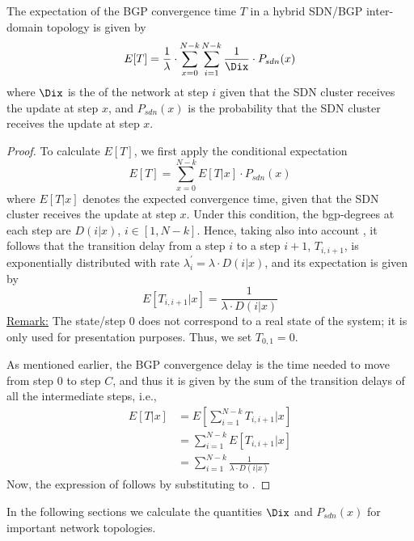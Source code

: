 \begin{theorem}\label{thm:expected-delay-generic}
The expectation of the BGP convergence time $T$ in a hybrid SDN/BGP inter-domain topology is given by
\begin{equation}\label{eq:theorem-expected-delay-generic}
E[T] = \frac{1}{\lambda}\cdot \sum_{x=0}^{N-k}\sum_{i=1}^{N-k}\frac{1}{\Dix}\cdot P_{sdn}(x)
\end{equation}
where $\Dix$ is the \bgp of the network at step $i$ given that the SDN cluster receives the update at step $x$, and $P_{sdn}(x)$ is the probability that the SDN cluster receives the update at step $x$.
\end{theorem}
\begin{proof}
To calculate $E[T]$, we first apply the conditional expectation
\begin{equation}\label{eq:ET-sum-ETx}
E[T] = \sum_{x=0}^{N-k}E[T|x]\cdot P_{sdn}(x)
\end{equation}
where $E[T|x]$ denotes the expected convergence time, given that the SDN cluster receives the update at step $x$. Under this condition, the bgp-degrees at each step are $D(i|x)$, $i\in[1,N-k]$. Hence, taking also into account , it follows that the transition delay from a step $i$ to a step $i+1$, $T_{i,i+1}$, is exponentially distributed with rate $\lambda_{i}^{'} = \lambda\cdot D(i|x)$, and its expectation is given by
\begin{equation}
E[T_{i,i+1}|x] = \frac{1}{\lambda\cdot D(i|x)}
\end{equation}
\underline{Remark:} The state/step $0$ does not correspond to a real state of the system; it is only used for presentation purposes. Thus, we set $T_{0,1}=0$.

As mentioned earlier, the BGP convergence delay is the time needed to move from step $0$ to step $C$, and thus it is given by the sum of the transition delays of all the intermediate steps, i.e., 
\begin{align}\label{eq:ETx-sum-Dix}
E[T|x] 	&= E\left[\sum_{i=1}^{N-k}T_{i,i+1}|x\right] \nonumber\\
		&= \sum_{i=1}^{N-k}E[T_{i,i+1}|x] \nonumber\\
		&= \sum_{i=1}^{N-k}\frac{1}{\lambda\cdot D(i|x)}
\end{align}
Now, the expression of  follows by substituting  to .
\end{proof}


In the following sections we calculate the quantities ${\Dix}$ and $P_{sdn}(x)$ for important network topologies.



